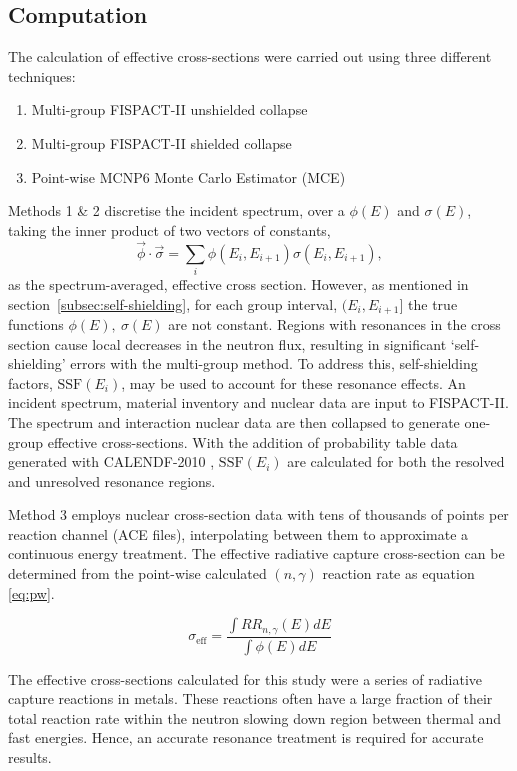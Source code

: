 \subsection{Computation}
\label{subsec:computation}
The calculation of effective cross-sections were carried out using three different techniques:

\begin{enumerate}
  \item Multi-group FISPACT-II unshielded collapse
  \item Multi-group FISPACT-II shielded collapse
  \item Point-wise MCNP6 Monte Carlo Estimator (MCE)
\end{enumerate}

Methods 1 \& 2 discretise the incident spectrum, over a  $\phi(E)$ and $\sigma(E)$, taking the inner product of two vectors of constants,
$$\vec{\phi} \cdot \vec{\sigma} = \sum_i \phi(E_i , E_{i+1}) \sigma(E_i , E_{i+1}),$$
as the spectrum-averaged, effective cross section. However, as mentioned in section~\ref{subsec:self-shielding}, for each group interval, $(E_{i}, E_{i+1}]$ the true functions $\phi(E),\ \sigma(E)$ are not constant. Regions with resonances in the cross section cause local decreases in the neutron flux, resulting in significant `self-shielding' errors with the multi-group method. To address this, self-shielding factors, $\mathrm{SSF}(E_i)$, may be used to account for these resonance effects. An incident spectrum, material inventory and nuclear data are input to FISPACT-II. The spectrum and interaction nuclear data are then collapsed to generate one-group effective cross-sections. With the addition of probability table data generated with CALENDF-2010 \cite{sublet2011}, $\mathrm{SSF}(E_i)$ are calculated for both the resolved and unresolved resonance regions.

Method 3 employs nuclear cross-section data with tens of thousands of points per reaction channel (ACE files), interpolating between them to approximate a continuous energy treatment. The effective radiative capture cross-section can be determined from the point-wise calculated $(n,\gamma)$ reaction rate as equation \ref{eq:pw}. 

\begin{equation}
\label{eq:pw}
\sigma_\mathrm{eff} = \frac{\int RR_{n,\gamma}(E) dE}{\int \phi(E) dE}
\end{equation}

The effective cross-sections calculated for this study were a series of radiative capture reactions in metals. These reactions often have a large fraction of their total reaction rate within the neutron slowing down region between thermal and fast energies. Hence, an accurate resonance treatment is required for accurate results. 

